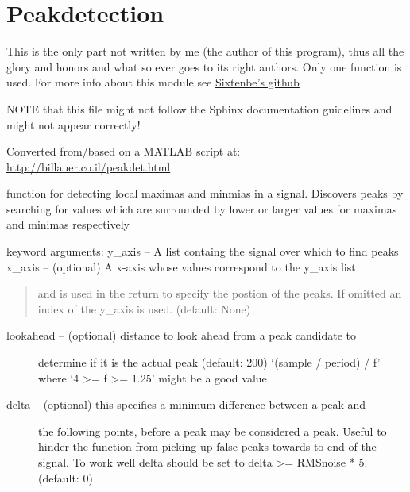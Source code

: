 \documentclass[letterpaper,10pt,english]{sphinxmanual}
\begin{document}
\section{Peakdetection}
\label{code:peakdetection}
This is the only part not written by me (the author of this program), thus all the glory and honors and what so ever goes to its right authors. Only one function is used.
For more info about this module see \href{https://gist.github.com/sixtenbe/1178136}{Sixtenbe's github}

NOTE that this file might not follow the Sphinx documentation guidelines and might not appear correctly!
\label{code:module-peakdet}

\begin{fulllineitems}
\label{code:peakdet.peakdetect}
Converted from/based on a MATLAB script at: 
\href{http://billauer.co.il/peakdet.html}{http://billauer.co.il/peakdet.html}

function for detecting local maximas and minmias in a signal.
Discovers peaks by searching for values which are surrounded by lower
or larger values for maximas and minimas respectively

keyword arguments:
y\_axis -- A list containg the signal over which to find peaks
x\_axis -- (optional) A x-axis whose values correspond to the y\_axis list
\begin{quote}

and is used in the return to specify the postion of the peaks. If
omitted an index of the y\_axis is used. (default: None)
\end{quote}
\begin{description}
\item[{lookahead -- (optional) distance to look ahead from a peak candidate to}] \leavevmode
determine if it is the actual peak (default: 200) 
`(sample / period) / f' where `4 \textgreater{}= f \textgreater{}= 1.25' might be a good value

\item[{delta -- (optional) this specifies a minimum difference between a peak and}] \leavevmode
the following points, before a peak may be considered a peak. Useful
to hinder the function from picking up false peaks towards to end of
the signal. To work well delta should be set to delta \textgreater{}= RMSnoise * 5.
(default: 0)
\begin{quote}


\end{quote}
\end{description}
\end{fulllineitems}
\end{document}
